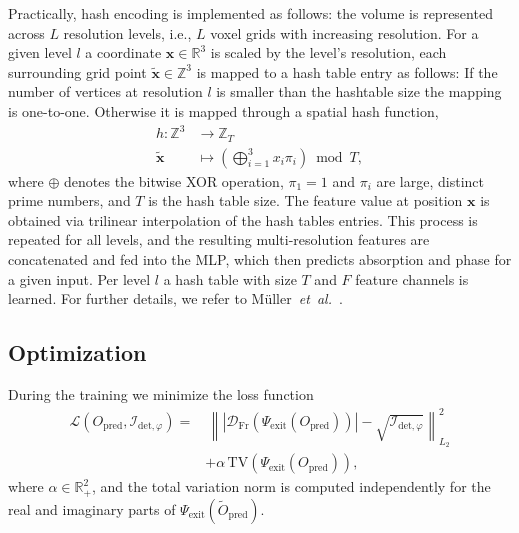 \documentclass{article}
\begin{document}
Practically, hash encoding is implemented as follows:  
the volume is represented across $L$ resolution levels, i.e., $L$ voxel grids with increasing resolution.  
For a given level $l$ a coordinate $\mathbf{x} \in \mathbb{R}^{3}$ is scaled by the level's resolution, each surrounding grid point $\tilde{\mathbf{x}} \in \mathbb{Z}^{3}$ is mapped to a hash table entry as follows:
If the number of vertices at resolution $l$ is smaller than the hashtable size the mapping is one-to-one.
Otherwise it is mapped through a spatial hash function,
\begin{equation}
\begin{split}
h : \mathbb{Z}^{3} &\rightarrow \mathbb{Z}_{T} \\
\tilde{\mathbf{x}} &\mapsto \left( \bigoplus_{i=1}^{3} x_{i} \pi_{i} \right) \bmod T,
\end{split}
\end{equation}
where $\oplus$ denotes the bitwise XOR operation, $\pi_{1}=1$ and $\pi_{i}$ are large, distinct prime numbers, and $T$ is the hash table size.  
The feature value at position $\mathbf{x}$ is obtained via trilinear interpolation of the hash tables entries.  
This process is repeated for all levels, and the resulting multi-resolution features are concatenated and fed into the MLP, which then predicts absorption and phase for a given input.
Per level $l$ a hash table with size $T$ and $F$ feature channels is learned.  
For further details, we refer to Müller~\textit{et~al.}~\cite{mullerInstantNeuralGraphics2022}.  

\subsection{Optimization}
During the training we minimize the loss function 
\begin{equation}
	\begin{split}
\mathcal{L}\!\left( O_{\mathrm{pred}}, \mathcal{I}_{\mathrm{det}, \varphi} \right)
 = &\, 
 \left\|
 \left|
 \mathcal{D}_{\mathrm{Fr}}\!\left(
 \Psi_{\mathrm{exit}}\!\left(
 O_{\mathrm{pred}}
 \right)
 \right)
 \right|
 -
 \sqrt{\mathcal{I}_{\mathrm{det}, \varphi}}
 \right\|_{L_{2}}^{2} \\[0.5em]
   & + \alpha\, \mathrm{TV}\!\left(
 \Psi_{\mathrm{exit}}\!\left(
 O_{\mathrm{pred}}
 \right)
 \right),
 \label{eq:loss}
\end{split}
\end{equation}
where $\alpha \in \mathbb{R}_{+}^{2}$, and the total variation norm is computed independently for the real and imaginary parts of $\Psi_{\mathrm{exit}}\!\left( \tilde{O}_{\mathrm{pred}} \right)$.  
 
\end{document}
